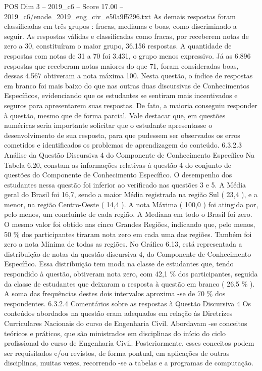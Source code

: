 \begin{textsample}{POS Dim 3 – 2019\_c6 – Score 17.00 – 2019\_c6/enade\_2019\_eng\_civ\_e50a9f5296.txt}
As demais respostas foram classificadas em três grupos : fracas, medianas e boas, como discriminado a seguir.
As respostas válidas e classificadas como fracas, por receberem notas de zero a 30, constituíram o maior grupo, 36.156 respostas.
A quantidade de respostas com notas de 31 a 70 foi 3.431, o grupo menos expressivo.
Já as 6.896 respostas que receberam notas maiores do que 71, foram consideradas boas, dessas 4.567 obtiveram a nota máxima 100.
Nesta questão, o índice de respostas em branco foi mais baixo do que nas outras duas discursivas de Conhecimentos Específicos, evidenciando que os estudantes se sentiram mais incentivados e seguros para apresentarem suas respostas.
De fato, a maioria conseguiu responder à questão, mesmo que de forma parcial.
Vale destacar que, em questões numéricas seria importante solicitar que o estudante apresentasse o desenvolvimento de sua resposta, para que pudessem ser observados os erros cometidos e identificados os problemas de aprendizagem do conteúdo. 6.3.2.3 Análise da Questão Discursiva 4 do Componente de Conhecimento Específico Na Tabela 6.20, constam as informações relativas à questão 4 do conjunto de questões do Componente de Conhecimento Específico.
O desempenho dos estudantes nessa questão foi inferior ao verificado nas questões 3 e 5.
A Média geral do Brasil foi 16,7, sendo a maior Média registrada na região Sul ( 23,4 ), e a menor, na região Centro-Oeste ( 14,4 ).
A nota Máxima ( 100,0 ) foi atingida por, pelo menos, um concluinte de cada região.
A Mediana em todo o Brasil foi zero.
O mesmo valor foi obtido nas cinco Grandes Regiões, indicando que, pelo menos, 50 \% dos participantes tiraram nota zero em cada uma das regiões.
Também foi zero a nota Mínima de todas as regiões.
No Gráfico 6.13, está representada a distribuição de notas da questão discursiva 4, do Componente de Conhecimento Específico.
Essa distribuição tem moda na classe de estudantes que, tendo respondido à questão, obtiveram nota zero, com 42,1 \% dos participantes, seguida da classe de estudantes que deixaram a resposta à questão em branco ( 26,5 \% ).
A soma das frequências destes dois intervalos aproxima -se de 70 \% dos respondentes. 6.3.2.4 Comentários sobre as respostas à Questão Discursiva 4 Os conteúdos abordados na questão eram adequados em relação às Diretrizes Curriculares Nacionais do curso de Engenharia Civil.
Abordavam -se conceitos teóricos e práticos, que são ministrados em disciplinas do início do ciclo profissional do curso de Engenharia Civil.
Posteriormente, esses conceitos podem ser requisitados e/ou revistos, de forma pontual, em aplicações de outras disciplinas, muitas vezes, recorrendo -se a tabelas e a programas de computação.

\end{textsample}
